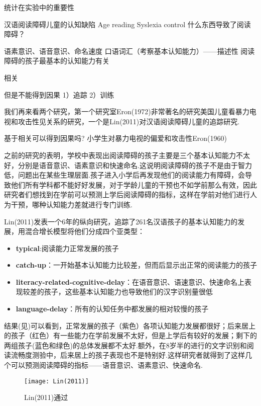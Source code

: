 统计在实验中的重要性

汉语阅读障碍儿童的认知缺陷 
Age reading Syslexia control
什么东西导致了阅读障碍？

语素意识、语音意识、命名速度 口语词汇（考察基本认知能力）——描述性
阅读障碍的孩子最基本的认知能力有关

相关

但是不能得到因果
1）追踪
2）训练

我们再来看两个研究，第一个研究室Eron(1972)非常著名的研究美国儿童看暴力电视和攻击性见关系的研究，一个是Lin(2011)对汉语阅读障碍儿童的追踪研究.

基于相关可以得到因果吗?
小学生对暴力电视的偏爱和攻击性Eron(1960)

之前的研究的表明，学校中表现出阅读障碍的孩子主要是三个基本认知能力不太好，分别是语音意识、语素意识和快速命名.这说明阅读障碍的孩子不是由于智力低，问题出在某些生理层面.孩子进入小学后再发现他们的阅读能力有障碍，会导致他们所有学科都不能好好发展，对于学龄儿童的干预也不如学前那么有效，因此研究者们想找到在学前可以预测上学后阅读障碍的指标，这样在学前对他们进行人为干预，哪种认知能力差就进行专门训练.

Lin(2011)发表一个6年的纵向研究，追踪了261名汉语孩子的基本认知能力的发展，用混合增长模型将他们分成四个亚类型：

\begin{itemize}
	\item \textbf{typical}:阅读能力正常发展的孩子
	\item \textbf{catch-up}：一开始基本认知能力比较差，但而后显示出正常的阅读能力的孩子
	\item \textbf{literacy-related-cognitive-delay}：在语音意识、语速意识、快速命名上表现较差的孩子，这些基本认知能力也导致他们的汉字识别量很低
	\item \textbf{language-delay}：所有的认知任务中都发展的相对较慢的孩子
\end{itemize}

结果(见)可以看到，正常发展的孩子（紫色）各项认知能力发展都很好；后来居上的孩子（红色）有一些能力在学前发展不太好，但是上学后有较好的发展；剩下的两组孩子(蓝色和绿色)的总体发展都不太好.额外，在8岁半的进行的文字识别和阅读流畅度测验中，后来居上的孩子表现也不是特别好.这样研究者就得到了这样几个可以预测阅读障碍的指标——语音意识、语素意识、快速命名.

\begin{figure*}
	\texttt{[image: Lin(2011)]}
	\caption{Lin(2011)通过}
\end{figure*}
	
